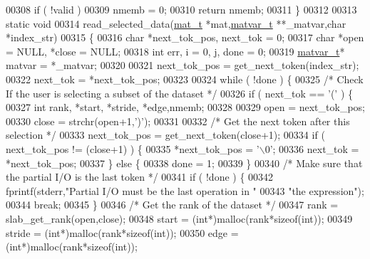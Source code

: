 \begin{DoxyCode}
{{{{{{00308     \textcolor{keywordflow}{if} ( !valid )
00309         nmemb = 0;
00310     \textcolor{keywordflow}{return} nmemb;
00311 \}
00312 
00313 \textcolor{keyword}{static} \textcolor{keywordtype}{void}
00314 read\_selected\_data(\hyperlink{struct__mat__t}{mat\_t} *mat,\hyperlink{group___m_a_t_structmatvar__t}{matvar\_t} **\_matvar,\textcolor{keywordtype}{char} *index\_str)
00315 \{
00316     \textcolor{keywordtype}{char} *next\_tok\_pos, next\_tok = 0;
00317     \textcolor{keywordtype}{char} *open = NULL, *close = NULL;
00318     \textcolor{keywordtype}{int} err, i = 0, j, done = 0;
00319     \hyperlink{group___m_a_t_structmatvar__t}{matvar\_t}* matvar = *\_matvar;
00320 
00321     next\_tok\_pos = get\_next\_token(index\_str);
00322     next\_tok = *next\_tok\_pos;
00323 
00324     \textcolor{keywordflow}{while} ( !done ) \{
00325         \textcolor{comment}{/* Check If the user is selecting a subset of the dataset */}
00326         \textcolor{keywordflow}{if} ( next\_tok == \textcolor{charliteral}{'('} ) \{
00327             \textcolor{keywordtype}{int} rank, *start, *stride, *edge,nmemb;
00328 
00329             open    = next\_tok\_pos;
00330             close   = strchr(open+1,\textcolor{charliteral}{')'});
00331 
00332             \textcolor{comment}{/* Get the next token after this selection */}
00333             next\_tok\_pos = get\_next\_token(close+1);
00334             \textcolor{keywordflow}{if} ( next\_tok\_pos != (close+1) ) \{
00335                 *next\_tok\_pos = \textcolor{charliteral}{'\(\backslash\)0'};
00336                 next\_tok = *next\_tok\_pos;
00337             \} \textcolor{keywordflow}{else} \{
00338                 done = 1;
00339             \}
00340             \textcolor{comment}{/* Make sure that the partial I/O is the last token */}
00341             \textcolor{keywordflow}{if} ( !done ) \{
00342                 fprintf(stderr,\textcolor{stringliteral}{"Partial I/O must be the last operation in "}
00343                              \textcolor{stringliteral}{"the expression"});
00344                 \textcolor{keywordflow}{break};
00345             \}
00346             \textcolor{comment}{/* Get the rank of the dataset */}
00347             rank   = slab\_get\_rank(open,close);
00348             start  = (\textcolor{keywordtype}{int}*)malloc(rank*\textcolor{keyword}{sizeof}(\textcolor{keywordtype}{int}));
00349             stride = (\textcolor{keywordtype}{int}*)malloc(rank*\textcolor{keyword}{sizeof}(\textcolor{keywordtype}{int}));
00350             edge   = (\textcolor{keywordtype}{int}*)malloc(rank*\textcolor{keyword}{sizeof}(\textcolor{keywordtype}{int}));
}}}}}}
\end{DoxyCode}
